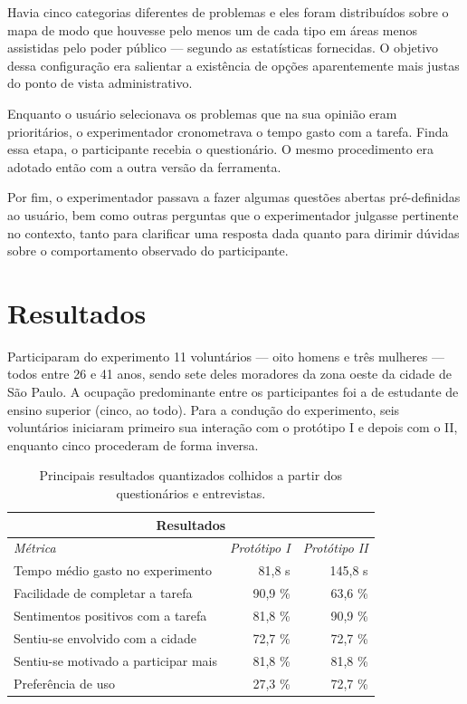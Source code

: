 \documentclass{sigchi}
\begin{document}
Havia cinco categorias diferentes de problemas e eles foram distribuídos sobre o mapa de modo que houvesse pelo menos um de cada tipo em áreas menos assistidas pelo poder público --- segundo as estatísticas fornecidas. O objetivo dessa configuração era salientar a existência de opções aparentemente mais justas do ponto de vista administrativo.

Enquanto o usuário selecionava os problemas que na sua opinião eram prioritários, o experimentador cronometrava o tempo gasto com a tarefa. Finda essa etapa, o participante recebia o questionário. O mesmo procedimento era adotado então com a outra versão da ferramenta.

Por fim, o experimentador passava a fazer algumas questões abertas pré-definidas ao usuário, bem como outras perguntas que o experimentador julgasse pertinente no contexto, tanto para clarificar uma resposta dada quanto para dirimir dúvidas sobre o comportamento observado do participante.


\section{Resultados}
Participaram do experimento 11 voluntários --- oito homens e três mulheres --- todos entre 26 e 41 anos, sendo sete deles moradores da zona oeste da cidade de São Paulo. A ocupação predominante entre os participantes foi a de estudante de ensino superior (cinco, ao todo). Para a condução do experimento, seis voluntários iniciaram primeiro sua interação com o protótipo I e depois com o II, enquanto cinco procederam de forma inversa.

\begin{table}
	\centering
	\begin{tabular}{l r r}
		\multicolumn{3}{c}{\small{\textbf{Resultados}}} \\
		\midrule
		{\small\textit{Métrica}}
		& {\small \textit{Protótipo I}}
		& {\small \textit{Protótipo II}} \\
		\midrule
		Tempo médio gasto no experimento & 81,8 s & 145,8 s\\
		Facilidade de completar a tarefa & 90,9 \% & 63,6 \%\\
		Sentimentos positivos com a tarefa & 81,8 \% & 90,9 \% \\
		Sentiu-se envolvido com a cidade & 72,7 \% & 72,7 \%\\
		Sentiu-se motivado a participar mais & 81,8 \% & 81,8 \%\\
		Preferência de uso & 27,3 \% & 72,7 \%\\
	\end{tabular}
	\caption{Principais resultados quantizados colhidos a partir dos questionários e entrevistas.}~\label{tab:table1}
\end{table}
\end{document}
